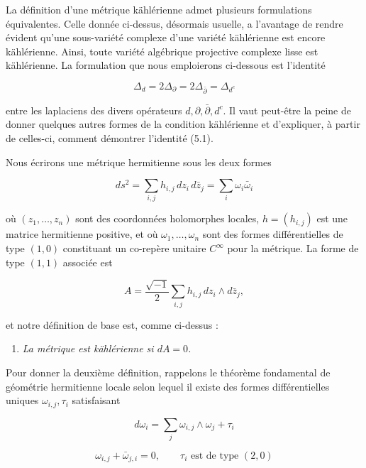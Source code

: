 \documentclass[
  french,
  a3paper,
  a3paper]{extarticle}
\providecommand{\tightlist}{%
  \setlength{\itemsep}{0pt}\setlength{\parskip}{0pt}}
\begin{document}
La définition d'une métrique kählérienne admet plusieurs formulations
équivalentes. Celle donnée ci-dessus, désormais usuelle, a l'avantage de
rendre évident qu'une sous-variété complexe d'une variété kählérienne
est encore kählérienne. Ainsi, toute variété algébrique projective
complexe lisse est kählérienne. La formulation que nous emploierons
ci-dessous est l'identité

\[\tag{5.1}\Delta_d=2\Delta_{\partial}=2\Delta_{\bar\partial}=\Delta_{d^c}\]

entre les laplaciens des divers opérateurs
\(d,\partial,\bar\partial,d^c\). Il vaut peut-être la peine de donner
quelques autres formes de la condition kählérienne et d'expliquer, à
partir de celles-ci, comment démontrer l'identité (5.1).

Nous écrirons une métrique hermitienne sous les deux formes

\[ds^2=\sum_{i,j}h_{i,j}\,dz_i\,d\bar z_j=\sum_i\omega_i\bar\omega_i\]

où \((z_1,\ldots,z_n)\) sont des coordonnées holomorphes locales,
\(h=(h_{i,j})\) est une matrice hermitienne positive, et où
\(\omega_1,\ldots,\omega_n\) sont des formes différentielles de type
\((1,0)\) constituant un co-repère unitaire \(C^\infty\) pour la
métrique. La forme de type \((1,1)\) associée est

\[A=\frac{\sqrt{-1}}{2}\sum_{i,j}h_{i,j}\,dz_i\wedge d\bar z_j,\]

et notre définition de base est, comme ci-dessus :

\begin{enumerate}
\def\labelenumi{(\roman{enumi})}
\tightlist
\item
  \emph{La métrique est kählérienne si \(dA=0\).}
\end{enumerate}

Pour donner la deuxième définition, rappelons le théorème fondamental de
géométrie hermitienne locale selon lequel il existe des formes
différentielles uniques \(\omega_{i,j},\tau_i\) satisfaisant

\[d\omega_i=\sum_j\omega_{i,j}\wedge\omega_j+\tau_i\]

\[\tag{5.2}\omega_{i,j}+\bar\omega_{j,i}=0,\qquad \tau_i\text{ est de type }(2,0)\]

\clearpage



\par
\end{document}
